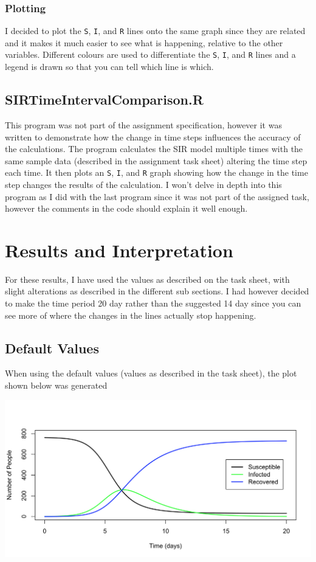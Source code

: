 \documentclass{article}
\begin{document}
        \subsubsection{Plotting}
            I decided to plot the \texttt{S}, \texttt{I}, and \texttt{R} lines onto the same graph since they are related and it makes it much easier to see what is happening, relative to the other variables. Different colours are used to differentiate the \texttt{S}, \texttt{I}, and \texttt{R} lines and a legend is drawn so that you can tell which line is which.
    
    \subsection{SIR\textunderscore Time\textunderscore Interval\textunderscore Comparison.R}
        This program was not part of the assignment specification, however it was written to demonstrate how the change in time steps influences the accuracy of the calculations. The program calculates the SIR model multiple times with the same sample data (described in the assignment task sheet) altering the time step each time. It then plots an \texttt{S}, \texttt{I}, and \texttt{R} graph showing how the change in the time step changes the results of the calculation. I won't delve in depth into this program as I did with the last program since it was not part of the assigned task, however the comments in the code should explain it well enough.

\section{Results and Interpretation}
    For these results, I have used the values as described on the task sheet, with slight alterations as described in the different sub sections. I had however decided to make the time period 20 day rather than the suggested 14 day since you can see more of where the changes in the lines actually stop happening.

    \subsection{Default Values}
        When using the default values (values as described in the task sheet), the plot shown below was generated

        \includegraphics[width=\textwidth,height=\textheight,keepaspectratio]{sir.png}
\end{document}
